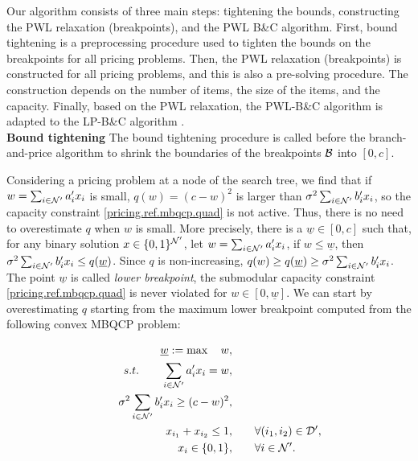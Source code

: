Our algorithm consists of three main steps: tightening the bounds, constructing the PWL relaxation (breakpoints), and the PWL B\&C algorithm. First, bound tightening is a preprocessing procedure used to tighten the bounds on the breakpoints for all pricing problems. Then, the PWL relaxation (breakpoints) is constructed for all pricing problems, and this is also a pre-solving procedure. The construction depends on the number of items, the size of the items, and the capacity. Finally, based on the PWL relaxation, the PWL-B\&C algorithm is adapted to the LP-B\&C algorithm \citep{coey2018outer}.\\


 
 
\textbf{Bound tightening} The bound tightening procedure is called before the branch-and-price algorithm to shrink the boundaries of the breakpoints \(\mathcal B\) into \([0,c]\).
 
Considering a pricing problem at a node of the search tree, we find that if $w = \sum_{i \in \mathcal N'} a'_i x_i$ is small, $q(w)=(c-w)^2$ is larger than $\sigma^2 \sum_{i\in \mathcal N'} b'_i x_i$, so the capacity constraint \eqref{pricing.ref.mbqcp.quad} is not active. Thus, there is no need to overestimate $q$ when $w$ is small. More precisely, there is a \(\underline{w} \in [0,c]\) such that, for any binary solution \(x \in \{0,1\}^{\mathcal N'}\), let \( w = \sum_{i \in \mathcal N'} a'_i x_i \), if \(w \le \underline{w}\), then \(\sigma^2\sum_{i \in \mathcal N'} b'_i x_i \le q(\underline{w})\). Since $q$ is non-increasing, \(q(w) \ge q(\underline{w}) \ge \sigma^2\sum_{i \in \mathcal N'} b'_i x_i\). The point $\underline{w}$ is called \textit{lower breakpoint}, the submodular capacity constraint \eqref{pricing.ref.mbqcp.quad} is never violated for $w \in [0,\underline{w}]$. We can start by overestimating \(q\) starting from the maximum lower breakpoint computed from the following convex MBQCP problem:
 
 \begin{equation}
\label{bdt.y1}
\begin{split}
	 \underline{w} := \max \quad w, \qquad& \\
    s.t. \qquad  \sum_{i \in \mathcal N'} a'_i x_i = w,\qquad& \\   
   \qquad \sigma^2 \sum_{i\in \mathcal N'} b'_i x_i \ge (c - w)^2,\qquad& \\
    x_{i_1} + x_{i_2} \le 1, \qquad & \forall (i_1, i_2) \in \mathcal D', \\
    x_i \in \{0,1\},\qquad & \forall  i  \in \mathcal N'.
\end{split}
\end{equation}

